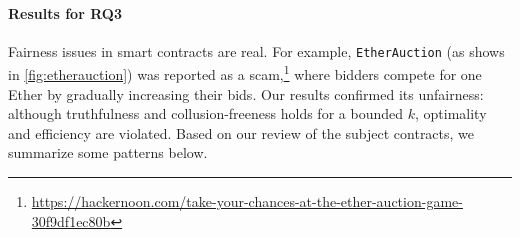 \paragraph{Results for RQ3}
Fairness issues in smart contracts are real.
For example, \texttt{EtherAuction} (as shows in \cref{fig:etherauction}) was reported as a
scam,\footnote{\url{https://hackernoon.com/take-your-chances-at-the-ether-auction-game-30f9df1ec80b}}
where bidders compete for one Ether by gradually increasing their bids.
Our results confirmed its unfairness: although truthfulness and collusion-freeness holds for a
bounded $k$, optimality and efficiency are violated.
Based on our review of the subject contracts, we summarize some patterns below.

